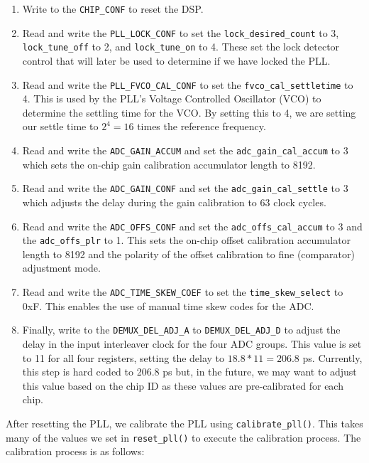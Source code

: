 \begin{enumerate}
    \item 
        Write to the \texttt{CHIP\_CONF} to reset the DSP.
    \item 
        Read and write the \texttt{PLL\_LOCK\_CONF} to set the \texttt{lock\_desired\_count} to 3, \texttt{lock\_tune\_off} to 2, and \texttt{lock\_tune\_on} to 4. 
        These set the lock detector control that will later be used to determine if we have locked the PLL.
    \item 
        Read and write the \texttt{PLL\_FVCO\_CAL\_CONF} to set the \texttt{fvco\_cal\_settletime} to 4. 
        This is used by the PLL's Voltage Controlled Oscillator (VCO) to determine the settling time for the VCO.
        By setting this to 4, we are setting our settle time to $2^{4} = 16$ times the reference frequency.
    \item 
        Read and write the \texttt{ADC\_GAIN\_ACCUM} and set the \texttt{adc\_gain\_cal\_accum} to 3 which sets the on-chip gain calibration accumulator length to 8192. 
    \item 
        Read and write the \texttt{ADC\_GAIN\_CONF} and set the \texttt{adc\_gain\_cal\_settle} to 3 which adjusts the delay during the gain calibration to 63 clock cycles. 
    \item 
        Read and write the \texttt{ADC\_OFFS\_CONF} and set the \texttt{adc\_offs\_cal\_accum} to 3 and the \texttt{adc\_offs\_plr} to 1. 
        This sets the on-chip offset calibration accumulator length to 8192 and the polarity of the offset calibration to fine (comparator) adjustment mode. 
    \item 
        Read and write the \texttt{ADC\_TIME\_SKEW\_COEF} to set the \texttt{time\_skew\_select} to 0xF. 
        This enables the use of manual time skew codes for the ADC.
    \item 
        Finally, write to the \texttt{DEMUX\_DEL\_ADJ\_A} to \texttt{DEMUX\_DEL\_ADJ\_D} to adjust the delay in the input interleaver clock for the four ADC groups. 
        This value is set to 11 for all four registers, setting the delay to $18.8*11 = 206.8$ ps. 
        Currently, this step is hard coded to 206.8 ps but, in the future, we may want to adjust this value based on the chip ID as these values are pre-calibrated for each chip.
\end{enumerate}

After resetting the PLL, we calibrate the PLL using \texttt{calibrate\_pll()}.
This takes many of the values we set in \texttt{reset\_pll()} to execute the calibration process. 
The calibration process is as follows:

